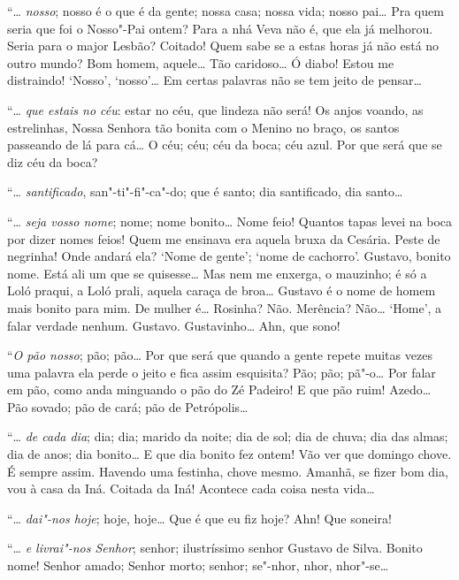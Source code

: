``\ldots{} \emph{nosso}; nosso é o que é da gente; nossa casa; nossa vida;
nosso pai\ldots{} Pra quem seria que foi o Nosso"-Pai ontem? Para a nhá Veva
não é, que ela já melhorou. Seria para o major Lesbão? Coitado! Quem
sabe se a estas horas já não está no outro mundo? Bom homem, aquele\ldots{}
Tão caridoso\ldots{} Ó diabo! Estou me distraindo! `Nosso', `nosso'\ldots{} Em
certas palavras não se tem jeito de pensar\ldots{}

``\ldots{} \emph{que estais no céu}: estar no céu, que lindeza não será! Os
anjos voando, as estrelinhas, Nossa Senhora tão bonita com o Menino no
braço, os santos passeando de lá para cá\ldots{} O céu; céu; céu da boca; céu
azul. Por que será que se diz céu da boca?

``\ldots{} \emph{santificado}, san"-ti"-fi"-ca"-do; que é santo; dia santificado,
dia santo\ldots{}

``\ldots{} \emph{seja vosso nome}; nome; nome bonito\ldots{} Nome feio! Quantos
tapas levei na boca por dizer nomes feios! Quem me ensinava era aquela
bruxa da Cesária. Peste de negrinha! Onde andará ela? `Nome de gente';
`nome de cachorro'. Gustavo, bonito nome. Está ali um que se quisesse\ldots{}
Mas nem me enxerga, o mauzinho; é só a Loló praqui, a Loló prali, aquela
caraça de broa\ldots{} Gustavo é o nome de homem mais bonito para mim. De
mulher é\ldots{} Rosinha? Não. Merência? Não\ldots{} `Home', a falar verdade
nenhum. Gustavo. Gustavinho\ldots{} Ahn, que sono!

``\emph{O pão nosso}; pão; pão\ldots{} Por que será que quando a gente repete
muitas vezes uma palavra ela perde o jeito e fica assim esquisita? Pão;
pão; pã"-o\ldots{} Por falar em pão, como anda minguando o pão do Zé Padeiro!
E que pão ruim! Azedo\ldots{} Pão sovado; pão de cará; pão de Petrópolis\ldots{}

``\ldots{} \emph{de cada dia}; dia; dia; marido da noite; dia de sol; dia de
chuva; dia das almas; dia de anos; dia bonito\ldots{} E que dia bonito fez
ontem! Vão ver que domingo chove. É sempre assim. Havendo uma festinha,
chove mesmo. Amanhã, se fizer bom dia, vou à casa da Iná. Coitada da
Iná! Acontece cada coisa nesta vida\ldots{}

``\ldots{} \emph{dai"-nos hoje}; hoje, hoje\ldots{} Que é que eu fiz hoje? Ahn! Que
soneira!

``\ldots{} \emph{e livrai"-nos Senhor}; senhor; ilustríssimo senhor Gustavo de
Silva. Bonito nome! Senhor amado; Senhor morto; senhor; se"-nhor, nhor,
nhor"-se\ldots{}


